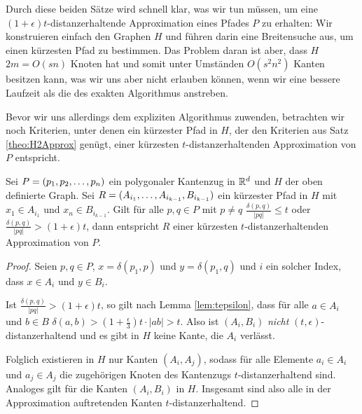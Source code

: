     Durch diese beiden Sätze wird schnell klar, was wir tun müssen, um eine $(1+\epsilon)t$-distanzerhaltende Approximation eines Pfades $P$ zu erhalten: 
    Wir konstruieren einfach den Graphen $H$ und führen darin eine Breitensuche aus, um einen kürzesten Pfad zu bestimmen. 
    Das Problem daran ist aber, dass $H$ $2m = O(sn)$ Knoten hat und somit unter Umständen $O(s^2n^2)$ Kanten besitzen kann, was wir uns aber nicht erlauben können, wenn wir eine bessere Laufzeit als die des exakten Algorithmus anstreben.
    
    Bevor wir uns allerdings dem expliziten Algorithmus zuwenden, betrachten wir noch Kriterien, unter denen ein kürzester Pfad in $H$, der den Kriterien aus Satz \ref{theo:H2Approx} genügt, einer kürzesten $t$-distanzerhaltenden Approximation von $P$ entspricht.
    
    \begin{theorem}
    	\label{theo:tcriteria}
    	Sei $P = (p_1, p_2, \mathellipsis, p_n)$ ein polygonaler Kantenzug in $\mathbb{R}^d$ und $H$ der oben definierte Graph. Sei $R = (A_{i_1}, \mathellipsis, A_{i_{k-1}}, B_{i_{k-1}})$ ein kürzester Pfad in $H$ mit $x_1 \in A_{i_1}$ und $x_n \in B_{i_{k-1}}$. Gilt für alle $p, q \in P$ mit $p \neq q$ $\frac{\delta(p, q)}{|pq|} \leq t$ oder $\frac{\delta(p, q)}{|pq|} > (1+\epsilon)t$, dann entspricht $R$ einer kürzesten $t$-distanzerhaltenden Approximation von $P$.
    \end{theorem}
    
    \begin{proof}
    	Seien $p, q \in P$, $x = \delta(p_1, p)$ und $y = \delta(p_1, q)$ und $i$ ein solcher Index, dass $x \in A_i$ und $y \in B_i$. 
    	
    	Ist $\frac{\delta(p, q)}{|pq|} > (1+\epsilon)t$, so gilt nach Lemma \ref{lem:tepsilon}, dass für alle $a \in A_i$ und $b \in B$ $\delta(a, b) > (1 + \frac{\epsilon}{3})t \cdot |ab| > t$. 
    	Also ist $(A_i, B_i)$ \emph{nicht} $(t, \epsilon)$-distanzerhaltend und es gibt in $H$ keine Kante, die $A_i$ verlässt. 
    	
    	Folglich existieren in $H$ nur Kanten $(A_i, A_j)$, sodass für alle Elemente $a_i \in A_i$ und $a_j \in A_j$ die zugehörigen Knoten des Kantenzugs $t$-distanzerhaltend sind.
    	Analoges gilt für die Kanten $(A_i, B_i)$ in $H$.
    	Insgesamt sind also alle in der Approximation auftretenden Kanten $t$-distanzerhaltend.
    	
    \end{proof}
    
